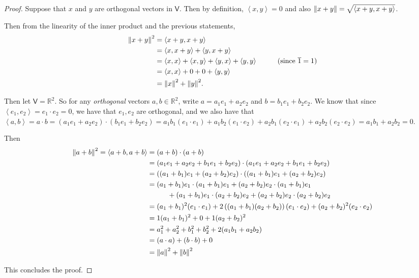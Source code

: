 \documentclass[11pt]{article}
\newcommand{\br}[1]{\left(#1\right)}
\newcommand{\abr}[1]{\left\langle#1\right\rangle}
\begin{document}
\begin{proof}
  Suppose that $x$ and $y$ are orthogonal vectors in $\mathsf{V}$. Then by definition, $\abr{x,y} = 0$ and also $\norm{x+y} = \sqrt{\abr{x+y,x+y}}$.

  Then from the linearity of the inner product and the previous statements, 
  \begin{align*}
    \norm{x+y}^2 &= \abr{x+y,x+y} \\
    &= \abr{x,x+y} + \abr{y,x+y} \\
    &= \abr{x,x} + \abr{x,y} + \abr{y,x} + \abr{y,y} \hspace{1cm}(\text{since }\overline{1} = 1) \\
    &= \abr{x,x} + 0 + 0 + \abr{y,y} \\
    &= \norm{x}^2 + \norm{y}^2.
  \end{align*}

  Then let $\mathsf{V}=\mathbb{R}^2$. So for any \textit{orthogonal} vectors $a,b\in\mathbb{R}^2$, write $a = a_1e_1 + a_2e_2$ and $b = b_1e_1 + b_2e_2$. We know that since $\abr{e_1,e_2} = e_1\cdot e_2 = 0$, we have that $e_1,e_2$ are orthogonal, and we also have that $\abr{a,b} = a\cdot b = (a_1e_1 + a_2e_2)\cdot (b_1e_1 + b_2e_2) = a_1b_1(e_1\cdot e_1) + a_1b_2(e_1\cdot e_2) + a_2b_1(e_2\cdot e_1) + a_2b_2(e_2\cdot e_2) = a_1b_1 + a_2b_2 = 0$.
  
  Then \begin{align*}
    \norm{a+b}^2 = \abr{a+b,a+b} &= (a+b)\cdot (a+b) \\
    &= (a_1e_1 + a_2e_2 + b_1e_1 + b_2e_2) \cdot (a_1e_1 + a_2e_2 + b_1e_1 + b_2e_2) \\
    &= \br{(a_1+b_1)e_1 + (a_2+b_2)e_2}\cdot \br{(a_1+b_1)e_1 + (a_2+b_2)e_2} \\
    &= 
    (a_1+b_1)e_1 \cdot (a_1+b_1)e_1 + (a_2+b_2)e_2 \cdot (a_1+b_1)e_1 \\ &\hspace{1cm}+ (a_1+b_1)e_1 \cdot (a_2+b_2)e_2 + (a_2+b_2)e_2 \cdot (a_2+b_2)e_2 \\
    &=(a_1+b_1)^2(e_1\cdot e_1) + 2\br{(a_1+b_1)(a_2+b_2)}(e_1\cdot e_2) + (a_2+b_2)^2(e_2\cdot e_2) \\
    &= 1(a_1+b_1)^2 + 0 + 1(a_2+b_2)^2 \\
    &= a_1^2+a_2^2 + b_1^2+b_2^2 +2(a_1b_1 + a_2b_2) \\
    &= (a\cdot a) + (b\cdot b) + 0 \\
    &= \norm{a}^2+\norm{b}^2
  \end{align*}

  This concludes the proof.
\end{proof}
\end{document}
